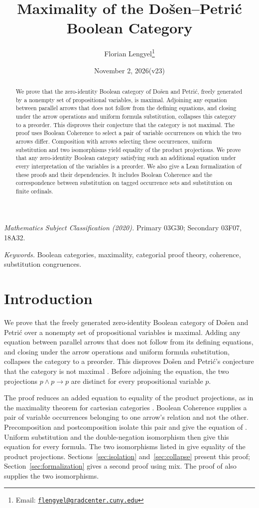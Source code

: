 \documentclass[11pt]{article}
\title{Maximality of the Do\v{s}en--Petri\'c Boolean Category}
\author{Florian Lengyel\thanks{Email: \href{mailto:flengyel@gradcenter.cuny.edu}{\texttt{flengyel@gradcenter.cuny.edu}}}}
\date{November 2, 2026\quad(v23)}
\begin{document}
\maketitle

\begin{abstract}
We prove that the zero-identity Boolean category of Do\v{s}en and
Petri\'c, freely generated by a nonempty set of propositional
variables, is maximal. Adjoining any equation between parallel arrows that does not follow
from the defining equations, and closing under the arrow operations
and uniform formula substitution, collapses this category to a preorder.
This disproves their conjecture that the category is not maximal.
The proof uses Boolean Coherence to select a pair of variable
occurrences on which the two arrows differ. Composition with arrows
selecting these occurrences, uniform substitution and two
isomorphisms yield equality of the product projections. We
prove that any zero-identity Boolean category satisfying such an
additional equation under every interpretation of the variables is
a preorder. We also give a Lean formalization of these proofs and
their dependencies. It includes Boolean Coherence and the
correspondence between substitution on tagged occurrence sets and
substitution on finite ordinals.
\end{abstract}

\medskip
\noindent\textit{Mathematics Subject Classification (2020).}
Primary 03G30; Secondary 03F07, 18A32.

\smallskip
\noindent\textit{Keywords.} Boolean categories, maximality, categorial proof theory,
coherence, substitution congruences.

\section{Introduction}

We prove that the freely generated zero-identity Boolean category of
Do\v{s}en and Petri\'c over a nonempty set of propositional variables
is maximal. Adding any equation between parallel arrows that does
not follow from its defining equations, and closing under the arrow
operations and uniform formula substitution, collapses the category
to a preorder. This disproves Do\v{s}en and Petri\'c's conjecture that the category
is not maximal \cite[\S14.2, p.~322]{DP}. Before adjoining the equation, the
two projections $p\wedge p\to p$ are distinct for every
propositional variable $p$.

The proof reduces an added equation to equality of the product
projections, as in the maximality theorem for cartesian categories
\cite[\S5]{DPCartesian}. Boolean Coherence supplies a pair of
variable occurrences belonging to one arrow's relation and not the
other. Precomposition and postcomposition isolate this pair and
give the equation of \cite[\S9.7, pp.~215--216]{DP}.
Uniform substitution and the double-negation isomorphism then give
this equation for every formula.
The two isomorphisms listed in \cite[\S12.5, p.~294]{DP}
give equality of the product projections. Sections~\ref{sec:isolation}
and~\ref{sec:collapse} present this proof; Section~\ref{sec:formalization}
gives a second proof using mix. The proof of
\cite[Lemma~7]{DPIsomorphic} also supplies the two isomorphisms.
\end{document}

